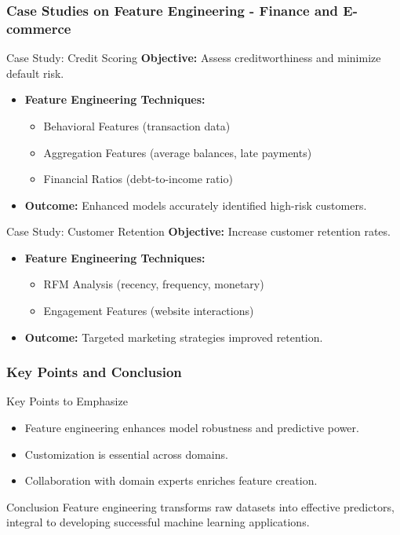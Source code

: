 \documentclass[aspectratio=169]{beamer}
\begin{document}
\begin{frame}[fragile]
    \frametitle{Case Studies on Feature Engineering - Finance and E-commerce}
    \begin{block}{Case Study: Credit Scoring}
        \textbf{Objective:} Assess creditworthiness and minimize default risk.
    \end{block}
    \begin{itemize}
        \item \textbf{Feature Engineering Techniques:}
            \begin{itemize}
                \item Behavioral Features (transaction data)
                \item Aggregation Features (average balances, late payments)
                \item Financial Ratios (debt-to-income ratio)
            \end{itemize}
        \item \textbf{Outcome:} Enhanced models accurately identified high-risk customers.
    \end{itemize}
    
    \begin{block}{Case Study: Customer Retention}
        \textbf{Objective:} Increase customer retention rates.
    \end{block}
    \begin{itemize}
        \item \textbf{Feature Engineering Techniques:}
            \begin{itemize}
                \item RFM Analysis (recency, frequency, monetary)
                \item Engagement Features (website interactions)
            \end{itemize}
        \item \textbf{Outcome:} Targeted marketing strategies improved retention.
    \end{itemize}
\end{frame}

\begin{frame}[fragile]
    \frametitle{Key Points and Conclusion}
    \begin{block}{Key Points to Emphasize}
        \begin{itemize}
            \item Feature engineering enhances model robustness and predictive power.
            \item Customization is essential across domains.
            \item Collaboration with domain experts enriches feature creation.
        \end{itemize}
    \end{block}
    \begin{block}{Conclusion}
        Feature engineering transforms raw datasets into effective predictors, integral to developing successful machine learning applications.
    \end{block}
\end{frame}
\end{document}
